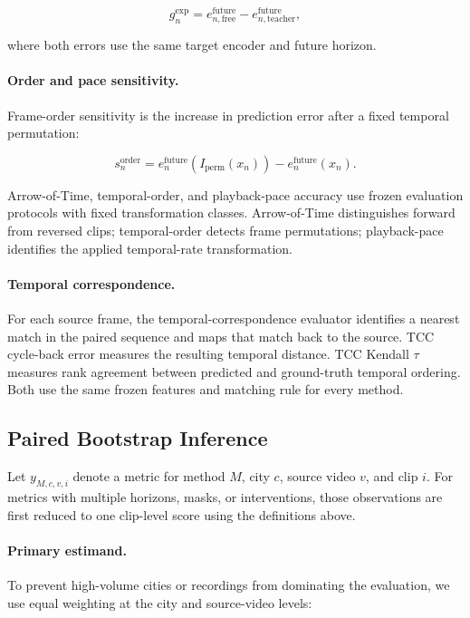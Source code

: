 \begin{equation*}
g_n^{\mathrm{exp}}
=
e_{n,\mathrm{free}}^{\mathrm{future}}
-
e_{n,\mathrm{teacher}}^{\mathrm{future}},
\end{equation*}

where both errors use the same target encoder and future horizon.

\paragraph{Order and pace sensitivity.}
Frame-order sensitivity is the increase in prediction error after a
fixed temporal permutation:

\begin{equation*}
s_n^{\mathrm{order}}
=
e_n^{\mathrm{future}}
\left(
I_{\mathrm{perm}}(x_n)
\right)
-
e_n^{\mathrm{future}}(x_n).
\end{equation*}

Arrow-of-Time, temporal-order, and playback-pace accuracy use frozen
evaluation protocols with fixed transformation classes. Arrow-of-Time
distinguishes forward from reversed clips; temporal-order detects frame
permutations; playback-pace identifies the applied temporal-rate
transformation.

\paragraph{Temporal correspondence.}
For each source frame, the temporal-correspondence evaluator identifies
a nearest match in the paired sequence and maps that match back to the
source. TCC cycle-back error measures the resulting temporal distance.
TCC Kendall \(\tau\) measures rank agreement between predicted and
ground-truth temporal ordering. Both use the same frozen features and
matching rule for every method.


\subsection{Paired Bootstrap Inference}
\label{app:clustered_statistics}

Let \(y_{M,c,v,i}\) denote a metric for method \(M\), city \(c\),
source video \(v\), and clip \(i\). For metrics with
multiple horizons, masks, or interventions, those observations are
first reduced to one clip-level score using the definitions above.

\paragraph{Primary estimand.}
To prevent high-volume cities or recordings from dominating the
evaluation, we use equal weighting at the city and source-video levels:

